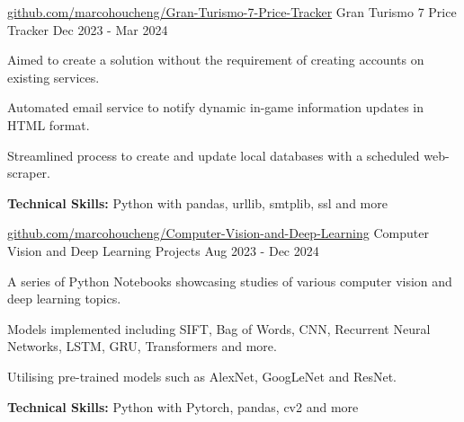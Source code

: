 \begin{cventries}

  \cventry
    {\href{https://github.com/marcohoucheng/Gran-Turismo-7-Price-Tracker}{github.com/marcohoucheng/Gran-Turismo-7-Price-Tracker}} %
    {Gran Turismo 7 Price Tracker} %
    {} %
    {Dec 2023 - Mar 2024} %
    {
        \begin{cvitems} %
            \item {Aimed to create a solution without the requirement of creating accounts on existing services.}
            \item {Automated email service to notify dynamic in-game information updates in HTML format.}
            \item {Streamlined process to create and update local databases with a scheduled web-scraper.}
            \item {\textbf{Technical Skills:} Python with pandas, urllib, smtplib, ssl and more}
        \end{cvitems}
    }
    

  \cventry
    {\href{https://github.com/marcohoucheng/Computer-Vision-and-Deep-Learning}{github.com/marcohoucheng/Computer-Vision-and-Deep-Learning}} %
    {Computer Vision and Deep Learning Projects} %
    {} %
    {Aug 2023 - Dec 2024} %
    {
        \begin{cvitems} %
            \item {A series of Python Notebooks showcasing studies of various computer vision and deep learning topics.}
            \item {Models implemented including SIFT, Bag of Words, CNN, Recurrent Neural Networks, LSTM, GRU, Transformers and more.}
            \item {Utilising pre-trained models such as AlexNet, GoogLeNet and ResNet.}
            \item {\textbf{Technical Skills:} Python with Pytorch, pandas, cv2 and more}
        \end{cvitems}
    }



\end{cventries}